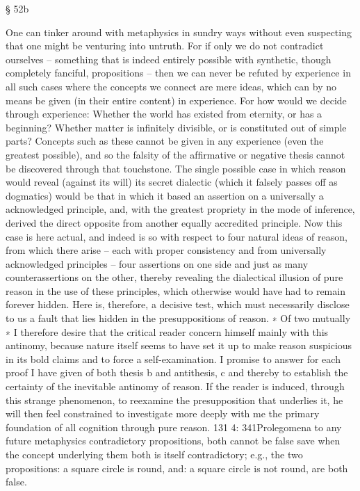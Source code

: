 § 52b

One can tinker around with metaphysics in sundry ways without even
suspecting that one might be venturing into untruth. For if only we do
not contradict ourselves – something that is indeed entirely possible with
synthetic, though completely fanciful, propositions – then we can never
be refuted by experience in all such cases where the concepts we connect
are mere ideas, which can by no means be given (in their entire content) in
experience. For how would we decide through experience: Whether the
world has existed from eternity, or has a beginning? Whether matter is
inﬁnitely divisible, or is constituted out of simple parts? Concepts such as
these cannot be given in any experience (even the greatest possible), and
so the falsity of the afﬁrmative or negative thesis cannot be discovered
through that touchstone.
The single possible case in which reason would reveal (against its
will) its secret dialectic (which it falsely passes off as dogmatics) would
be that in which it based an assertion on a universally a acknowledged
principle, and, with the greatest propriety in the mode of inference,
derived the direct opposite from another equally accredited principle.
Now this case is here actual, and indeed is so with respect to four natural
ideas of reason, from which there arise – each with proper consistency
and from universally acknowledged principles – four assertions on one
side and just as many counterassertions on the other, thereby revealing
the dialectical illusion of pure reason in the use of these principles, which
otherwise would have had to remain forever hidden.
Here is, therefore, a decisive test, which must necessarily disclose to us
a fault that lies hidden in the presuppositions of reason. ∗ Of two mutually
∗
I therefore desire that the critical reader concern himself mainly with this
antinomy, because nature itself seems to have set it up to make reason suspicious
in its bold claims and to force a self-examination. I promise to answer for each
proof I have given of both thesis b and antithesis, c and thereby to establish the
certainty of the inevitable antinomy of reason. If the reader is induced, through
this strange phenomenon, to reexamine the presupposition that underlies it,
he will then feel constrained to investigate more deeply with me the primary
foundation of all cognition through pure reason.
131
4: 341Prolegomena to any future metaphysics
contradictory propositions, both cannot be false save when the concept
underlying them both is itself contradictory; e.g., the two propositions:
a square circle is round, and: a square circle is not round, are both false.
